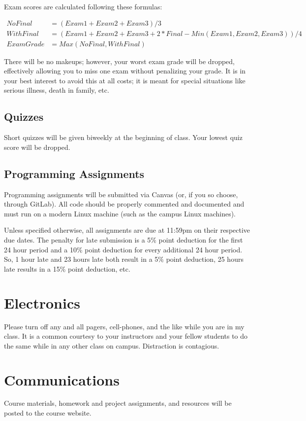 \documentclass{article}
\begin{document}
Exam scores are calculated following these formulas:

\begin{align*}
	NoFinal &= (Exam1+Exam2+Exam3)/3 \\
	WithFinal &= (Exam1+Exam2+Exam3+2*Final-Min(Exam1,Exam2,Exam3))/4 \\
	ExamGrade &= Max(NoFinal, WithFinal)
\end{align*}

There will be no makeups; however, your worst exam grade will be dropped, effectively allowing you to miss one exam without penalizing your grade.
It is in your best interest to avoid this at all costs; it is meant for special situations like serious illness, death in family, etc.

\subsection{Quizzes}
Short quizzes will be given biweekly at the beginning of class.
Your lowest quiz score will be dropped.

\subsection{Programming Assignments}
Programming assignments will be submitted via Canvas (or, if you so choose, through GitLab).
All code should be properly commented and documented and must run on a modern Linux machine (such as the campus Linux machines).

Unless specified otherwise, all assignments are due at 11:59pm on their respective due dates.
The penalty for late submission is a 5\% point deduction for the first 24 hour period and a 10\% point deduction for every additional 24 hour period.
So, 1 hour late and 23 hours late both result in a 5\% point deduction, 25 hours late results in a 15\% point deduction, etc.

\section{Electronics}
Please turn off any and all pagers, cell-phones, and the like while you are in my class.
It is a common courtesy to your instructors and your fellow students to do the same while in any other class on campus.
Distraction is contagious.

\section{Communications}
Course materials, homework and project assignments, and resources will be posted to the course website.
\end{document}
